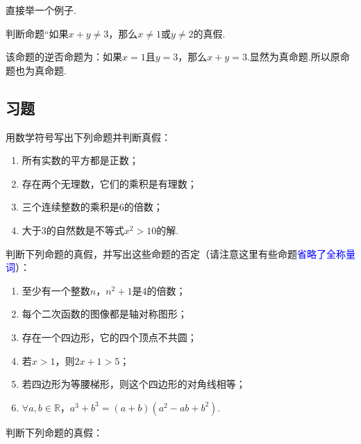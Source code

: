 \documentclass[lang=cn,math=cm,chinesefont=nofont,11pt,scheme=chinese,twocol]{elegantbook}
\begin{document}
直接举一个例子.

\begin{example}
  判断命题“如果$x+y\neq 3$，那么$x\neq 1$或$y\neq 2$的真假.
\end{example}

\begin{solution}
  该命题的逆否命题为：如果$x=1$且$y=3$，那么$x+y=3$.显然为真命题.所以原命题也为真命题.
\end{solution}

\subsection{习题}

\begin{exercise}
  用数学符号写出下列命题并判断真假：
\end{exercise}

\begin{enumerate}
  \item 所有实数的平方都是正数；
  \item 存在两个无理数，它们的乘积是有理数；
  \item 三个连续整数的乘积是6的倍数；
  \item 大于3的自然数是不等式$x^2>10$的解.
\end{enumerate}

\begin{exercise}
  判断下列命题的真假，并写出这些命题的否定（请注意这里有些命题\textcolor{blue}{省略了全称量词}）：
\end{exercise}

\begin{enumerate}
  \item 至少有一个整数$n$，$n^2+1$是4的倍数；
  \item 每个二次函数的图像都是轴对称图形；
  \item 存在一个四边形，它的四个顶点不共圆；
  \item 若$x>1$，则$2x+1>5$；
  \item 若四边形为等腰梯形，则这个四边形的对角线相等；
   \item $\forall a,b{\in}\mathbb{R}$，$a^3+b^3=(a+b)(a^2-ab+b^2)$.
\end{enumerate}

\begin{exercise}
  判断下列命题的真假：
\end{exercise}
\end{document}
